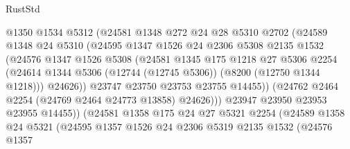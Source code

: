 \begin{lexlean}{RustStd}
\begin{coremodule}
                          @1350
                          @1534
                          @5312
                          (@24581
                            @1348
                            @272
                            @24
                            @28
                            @5310
                            @2702
                            (@24589
                              @1348
                              @24
                              @5310
                              (@24595
                                @1347
                                @1526
                                @24
                                @2306
                                @5308
                                @2135
                                @1532
                                (@24576
                                  @1347
                                  @1526
                                  @5308
                                  (@24581
                                    @1345
                                    @175
                                    @1218
                                    @27
                                    @5306
                                    @2254
                                    (@24614
                                      @1344
                                      @5306
                                      (@12744 (@12745 @5306))
                                      (@8200 (@12750 @1344 @1218)))
                                    @24626))
                                @23747
                                @23750
                                @23753
                                @23755
                                @14455))
                            (@24762 @2464 @2254 (@24769 @2464 @24773 @13858) @24626)))
                        @23947
                        @23950
                        @23953
                        @23955
                        @14455))
                    (@24581
                      @1358
                      @175
                      @24
                      @27
                      @5321
                      @2254
                      (@24589
                        @1358
                        @24
                        @5321
                        (@24595
                          @1357
                          @1526
                          @24
                          @2306
                          @5319
                          @2135
                          @1532
                          (@24576
                            @1357

\end{coremodule}
\end{lexlean}
